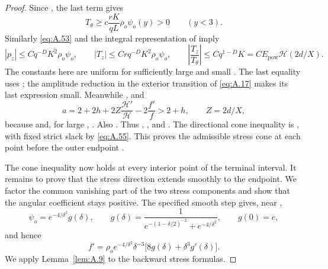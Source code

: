 \begin{proof}
%
Since , the last term gives
\[
  T_\theta\geq c\frac{rK}{qL}\rho_o\psi_o(y)>0\qquad(y<3).
\]
Similarly \eqref{eq:A.53} and the integral representation of  imply
\begin{equation}
  |p_z|\leq Cq^{-D}K^2\rho_o\psi_o,
  \qquad |T_z|\leq Crq^{-D}K^2\rho_o\psi_o,
  \qquad \left|\frac{T_z}{T_\theta}\right|\leq Cq^{1-D}K
  =CE_{\mathrm{pow}}\mathcal H(2d/X).
  \tag{A.55}\label{eq:A.55}
\end{equation}
The constants here are uniform for sufficiently large  and small . The last
equality uses ; the amplitude reduction in the exterior transition of \eqref{eq:A.17} makes its last
expression small. Meanwhile , and
\begin{equation}
  a=2+2h+2Z\frac{\mathcal H'}{\mathcal H}-2\frac{f'}f>2+h,
  \qquad Z=2d/X,
  \tag{A.56}\label{eq:A.56}
\end{equation}
because  and, for large ,
. Also . Thus
,
, and
. The directional cone inequality is
, with fixed strict slack by \eqref{eq:A.55}. This proves the admissible stress
cone at each point before the outer endpoint .

The cone inequality now holds at every interior point of the terminal interval. It remains to prove that the stress direction
extends smoothly to the endpoint. We factor the common vanishing part of the two stress components and show that the angular
coefficient stays positive. The specified smooth step gives, near ,
\[
  \psi_o=e^{-4/\delta^2}g(\delta),
  \qquad
  g(\delta)=\frac{1}{e^{-(1-\delta/2)^{-2}}+e^{-4/\delta^2}},
  \qquad g(0)=e,
\]
and hence
\[
  f'=\rho_oe^{-4/\delta^2}\delta^{-3}\bigl[8g(\delta)+\delta^3g'(\delta)\bigr].
\]
We apply Lemma~\ref{lem:A.9} to the backward stress formulas.


\end{proof}

